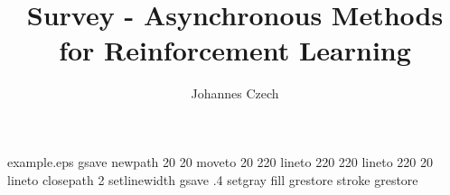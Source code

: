 %
%
%
%
%
\begin{filecontents*}{example.eps}
    gsave
    newpath
    20 20 moveto
    20 220 lineto
    220 220 lineto
    220 20 lineto
    closepath
    2 setlinewidth
    gsave
    .4 setgray fill
    grestore
    stroke
    grestore
\end{filecontents*}
%
\RequirePackage{fix-cm}
%
\documentclass[smallextended]{svjour3}       %
%
\smartqed  %
%
\usepackage{graphicx}
%
%
%
%
%


    \title{Survey - Asynchronous Methods for Reinforcement Learning%
    }


    \author{Johannes Czech
    }


